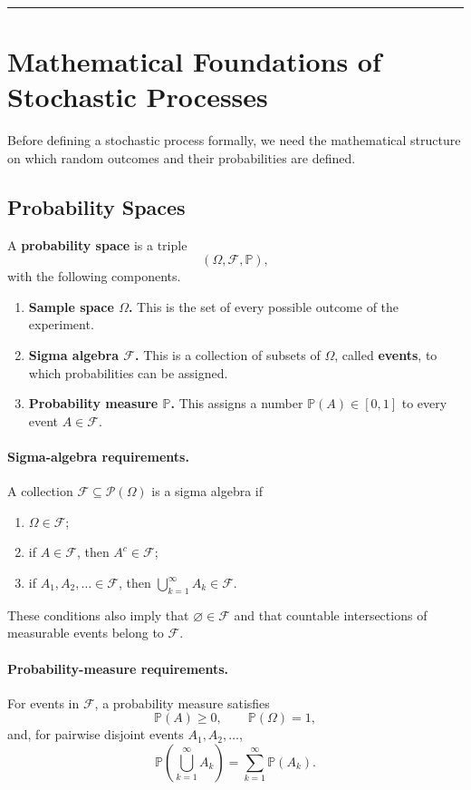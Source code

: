 \documentclass[12pt,openany]{book}
\theoremstyle{definition}
\theoremstyle{remark}
\begin{document}
\medskip
\hrule
\medskip

\section{Mathematical Foundations of Stochastic Processes}

Before defining a stochastic process formally, we need the mathematical
structure on which random outcomes and their probabilities are defined.

\subsection{Probability Spaces}

A \textbf{probability space} is a triple
\[
(\Omega,\mathcal{F},\mathbb{P}),
\]
with the following components.

\begin{enumerate}
    \item \textbf{Sample space \(\Omega\).} This is the set of every possible
    outcome of the experiment.

    \item \textbf{Sigma algebra \(\mathcal{F}\).} This is a collection of
    subsets of \(\Omega\), called \textbf{events}, to which probabilities can
    be assigned.

    \item \textbf{Probability measure \(\mathbb{P}\).} This assigns a number
    \(\mathbb{P}(A)\in[0,1]\) to every event \(A\in\mathcal{F}\).
\end{enumerate}

\paragraph{Sigma-algebra requirements.}
A collection \(\mathcal{F}\subseteq\mathcal{P}(\Omega)\) is a sigma algebra
if
\begin{enumerate}
    \item \(\Omega\in\mathcal{F}\);
    \item if \(A\in\mathcal{F}\), then \(A^c\in\mathcal{F}\);
    \item if \(A_1,A_2,\ldots\in\mathcal{F}\), then
    \(\bigcup_{k=1}^{\infty}A_k\in\mathcal{F}\).
\end{enumerate}
These conditions also imply that \(\varnothing\in\mathcal{F}\) and that
countable intersections of measurable events belong to \(\mathcal{F}\).

\paragraph{Probability-measure requirements.}
For events in \(\mathcal{F}\), a probability measure satisfies
\[
\mathbb{P}(A)\geq0,
\qquad
\mathbb{P}(\Omega)=1,
\]
and, for pairwise disjoint events \(A_1,A_2,\ldots\),
\[
\mathbb{P}\!\left(\bigcup_{k=1}^{\infty}A_k\right)
=\sum_{k=1}^{\infty}\mathbb{P}(A_k).
\]
\end{document}
